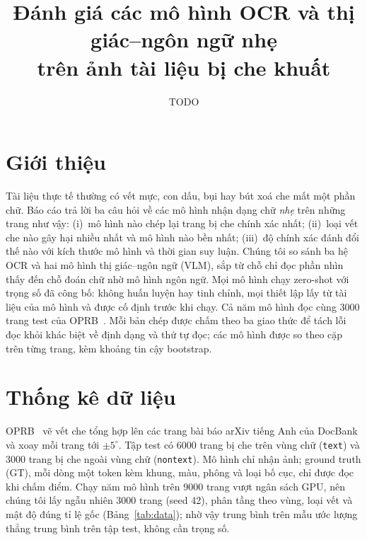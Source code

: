 \documentclass[10pt,a4paper]{article}
\title{Đánh giá các mô hình OCR và thị giác--ngôn ngữ nhẹ\\trên ảnh tài liệu bị che khuất}
\author{TODO}
\date{}
\begin{document}
\maketitle

\section{Giới thiệu}
Tài liệu thực tế thường có vết mực, con dấu, bụi hay bút xoá che mất một phần chữ. Báo cáo trả lời ba câu hỏi
về các mô hình nhận dạng chữ \emph{nhẹ} trên những trang như vậy: (i)~mô hình nào chép lại trang bị che chính
xác nhất; (ii)~loại vết che nào gây hại nhiều nhất và mô hình nào bền nhất; (iii)~độ chính xác đánh đổi thế
nào với kích thước mô hình và thời gian suy luận. Chúng tôi so sánh ba hệ OCR và hai mô hình thị giác--ngôn ngữ
(VLM), sắp từ chỗ chỉ đọc phần nhìn thấy đến chỗ đoán chữ nhờ mô hình ngôn ngữ. Mọi mô hình chạy zero-shot
với trọng số đã công bố: không huấn luyện hay tinh chỉnh, mọi thiết lập lấy từ tài liệu của mô hình và được
cố định trước khi chạy. Cả năm mô hình đọc cùng 3000 trang test của OPRB~\cite{oprb}. Mỗi bản chép được chấm
theo ba giao thức để tách lỗi đọc khỏi khác biệt về định dạng và thứ tự đọc; các mô hình được so theo cặp
trên từng trang, kèm khoảng tin cậy bootstrap.

\section{Thống kê dữ liệu}
OPRB~\cite{oprb} vẽ vết che tổng hợp lên các trang bài báo arXiv tiếng Anh của DocBank và xoay mỗi trang
tới $\pm5^\circ$. Tập test có 6000 trang bị che trên vùng chữ (\texttt{text}) và 3000 trang bị che ngoài vùng
chữ (\texttt{nontext}). Mô hình chỉ nhận ảnh; ground truth (GT), mỗi dòng một token kèm khung, màu, phông và
loại bố cục, chỉ được đọc khi chấm điểm. Chạy năm mô hình trên 9000 trang vượt ngân sách GPU, nên chúng tôi
lấy ngẫu nhiên 3000 trang (seed 42), phân tầng theo vùng, loại vết và mật độ đúng tỉ lệ gốc
(Bảng~\ref{tab:data}); nhờ vậy trung bình trên mẫu ước lượng thẳng trung bình trên tập test, không cần trọng số.
\end{document}
